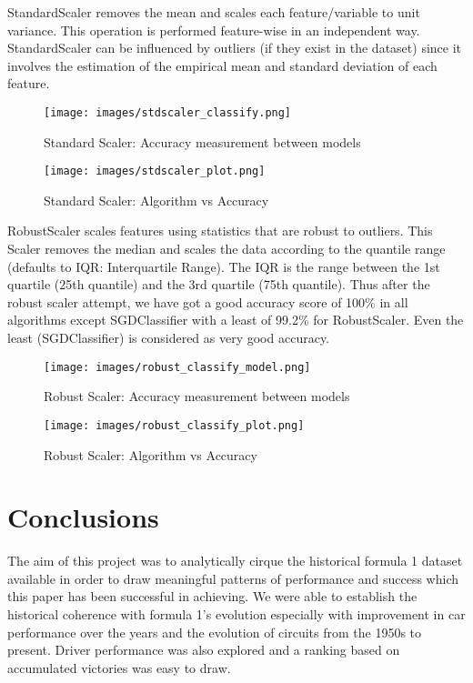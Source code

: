 \documentclass[10pt,twocolumn,letterpaper]{article}
\begin{document}
StandardScaler removes the mean and scales each feature/variable to unit variance. This operation is performed feature-wise in an independent way. StandardScaler can be influenced by outliers (if they exist in the dataset) since it involves the estimation of the empirical mean and standard deviation of each feature.

\begin{figure}[h]
\centering
\texttt{[image: images/stdscaler\_classify.png]}
\caption{Standard Scaler: Accuracy measurement between models}

\centering
\texttt{[image: images/stdscaler\_plot.png]} 
\caption{Standard Scaler: Algorithm vs Accuracy}
\end{figure}

RobustScaler scales features using statistics that are robust to outliers. This Scaler removes the median and scales the data according to the quantile range (defaults to IQR: Interquartile Range). The IQR is the range between the 1st quartile (25th quantile) and the 3rd quartile (75th quantile). Thus after the robust scaler attempt, we have got a good accuracy score of 100\% in all algorithms except SGDClassifier with a least of 99.2\% for RobustScaler. Even the least (SGDClassifier) is considered as very good accuracy.

\begin{figure}[h]
\centering
\texttt{[image: images/robust\_classify\_model.png]}
\caption{Robust Scaler: Accuracy measurement between models}

\texttt{[image: images/robust\_classify\_plot.png]} 
\caption{Robust Scaler: Algorithm vs Accuracy}
\end{figure}


\section{Conclusions}
The aim of this project was to analytically cirque the historical formula 1 dataset available in order to draw meaningful patterns of performance and success which this paper has been successful in achieving. We were able to establish the historical coherence with formula 1's evolution especially with improvement in car performance over the years and the evolution of circuits from the 1950s to present. Driver performance was also explored and a ranking based on accumulated victories was easy to draw. \\
\end{document}
